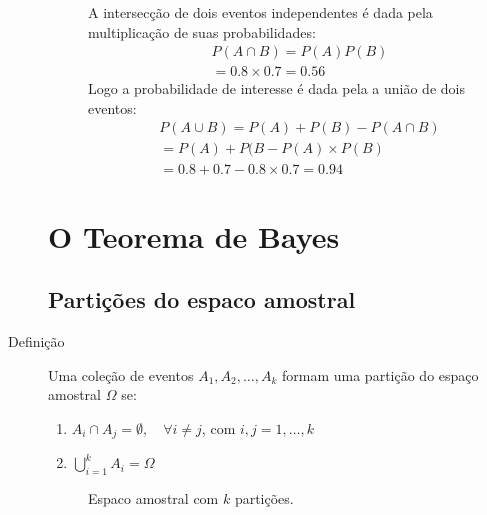 \begin{description}
\begin{description}
\begin{example}
        A intersecção de dois eventos independentes é dada pela multiplicação de suas probabilidades:
        \begin{align*}
          P(A \cap B)= P(A)P(B)\\
          =0.8 \times 0.7= 0.56
        \end{align*}
        Logo a probabilidade de interesse é dada pela a união de dois eventos:
        \begin{align*}
          P(A \cup B)= P(A)+ P(B)- P( A \cap B )\\
          = P(A) + P(B- P(A)\times P(B)\\
          = 0.8+0.7 - 0.8\times 0.7        =0.94
        \end{align*}

    \end{example}
\end{description}
  \section{O Teorema de Bayes}
  \subsection{Partições do espaco amostral}
\item[Definição] Uma coleção de eventos $A_1, A_2, \ldots, A_k$ formam uma partição 
  do espaço amostral $\Omega$ se:

  \begin{enumerate}[leftmargin=*, label=\Roman*., widest=IV, align=left]
    \item $A_i \cap A_j = \emptyset, \quad \forall i\neq j$, com $i,j =1,\ldots,k$
    \item $\bigcup \limits_{i=1}^{k}A_i= \Omega$
  \end{enumerate}
  \begin{figure}[H]
    \centering
    
    \caption{Espaco amostral com $k$ partições.}
  \end{figure}
   \end{description}

